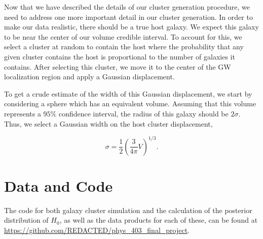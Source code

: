 Now that we have described the details of our cluster generation procedure, we need to address one more important detail in our cluster generation. In order to make our data realistic, there should be a true host galaxy. We expect this galaxy to be near the center of our volume credible interval. To account for this, we select a cluster at random to contain the host where the probability that any given cluster contains the host is proportional to the number of galaxies it contains. After selecting this cluster, we move it to the center of the GW localization region and apply a Gaussian displacement.

To get a crude estimate of the width of this Gaussian displacement, we start by considering a sphere which has an equivalent volume. Assuming that this volume represents a $95\%$ confidence interval, the radius of this galaxy should be $2\sigma$. Thus, we select a Gaussian width on the host cluster displacement,

\begin{equation}
  \sigma = \frac{1}{2}\left(\frac{3}{4\pi} V\right)^{1/3}.
\end{equation}

\section{\label{sec:code} Data and Code}

The code for both galaxy cluster simulation and the calculation of the posterior distribution of $H_0$, as well as the data products for each of these, can be found at \url{https://github.com/REDACTED/phys_403_final_project}.
